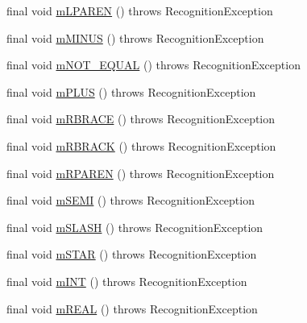 \begin{DoxyCompactItemize}
\item 
final void \hyperlink{classorg_1_1tzi_1_1use_1_1parser_1_1generator_1_1_generator_lexer_ab6093bdbcedbd48fe889b5f774836e62}{m\-L\-P\-A\-R\-E\-N} ()  throws Recognition\-Exception 
\item 
final void \hyperlink{classorg_1_1tzi_1_1use_1_1parser_1_1generator_1_1_generator_lexer_a8568092e95ec46ef25d8fd421801747f}{m\-M\-I\-N\-U\-S} ()  throws Recognition\-Exception 
\item 
final void \hyperlink{classorg_1_1tzi_1_1use_1_1parser_1_1generator_1_1_generator_lexer_a6dfc71425f333b8d1444a7d462f5b453}{m\-N\-O\-T\-\_\-\-E\-Q\-U\-A\-L} ()  throws Recognition\-Exception 
\item 
final void \hyperlink{classorg_1_1tzi_1_1use_1_1parser_1_1generator_1_1_generator_lexer_a7250e1a89c3733b9c94e83b7ba222d47}{m\-P\-L\-U\-S} ()  throws Recognition\-Exception 
\item 
final void \hyperlink{classorg_1_1tzi_1_1use_1_1parser_1_1generator_1_1_generator_lexer_aad2d4b169d906872016ec70bc2a3f582}{m\-R\-B\-R\-A\-C\-E} ()  throws Recognition\-Exception 
\item 
final void \hyperlink{classorg_1_1tzi_1_1use_1_1parser_1_1generator_1_1_generator_lexer_a1e6d22537d4fd78c712fdcd41fd1bd21}{m\-R\-B\-R\-A\-C\-K} ()  throws Recognition\-Exception 
\item 
final void \hyperlink{classorg_1_1tzi_1_1use_1_1parser_1_1generator_1_1_generator_lexer_a47ef30cecc25e703b11ea8d94504a9fd}{m\-R\-P\-A\-R\-E\-N} ()  throws Recognition\-Exception 
\item 
final void \hyperlink{classorg_1_1tzi_1_1use_1_1parser_1_1generator_1_1_generator_lexer_a7c20ffe755d6af12e829ddeece4d305b}{m\-S\-E\-M\-I} ()  throws Recognition\-Exception 
\item 
final void \hyperlink{classorg_1_1tzi_1_1use_1_1parser_1_1generator_1_1_generator_lexer_a458cac6b8eaac00a18c28b3c6f643f4e}{m\-S\-L\-A\-S\-H} ()  throws Recognition\-Exception 
\item 
final void \hyperlink{classorg_1_1tzi_1_1use_1_1parser_1_1generator_1_1_generator_lexer_a0c6fabb7077196b25a4ff7342c03a8e6}{m\-S\-T\-A\-R} ()  throws Recognition\-Exception 
\item 
final void \hyperlink{classorg_1_1tzi_1_1use_1_1parser_1_1generator_1_1_generator_lexer_a88fca22b3773ec4ff66e2b9c6ee8dc70}{m\-I\-N\-T} ()  throws Recognition\-Exception 
\item 
final void \hyperlink{classorg_1_1tzi_1_1use_1_1parser_1_1generator_1_1_generator_lexer_a5912e0bf46ec1bddfe0279345febc4c0}{m\-R\-E\-A\-L} ()  throws Recognition\-Exception 

\end{DoxyCompactItemize}
